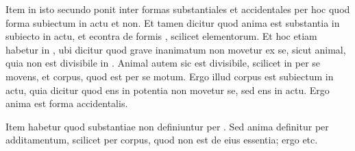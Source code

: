 \documentclass[b5paper,12pt]{book}
\begin{document}
\beginnumbering
{}

\pstart
   Item  in isto secundo ponit 
    inter formas substantiales et accidentales per hoc quod
   forma  subiectum in actu et
    non. Et tamen dicitur  quod anima est substantia in subiecto in
   actu, et econtra de formis , scilicet elementorum. Et hoc
   etiam habetur in ,
   ubi dicitur quod grave inanimatum non movetur ex se, sicut animal, quia non est divisibile in
   . Animal
   autem sic est divisibile, scilicet in 
    per se movens, et
   corpus, quod est per se motum. Ergo illud corpus est subiectum in actu, quia
   dicitur  quod ens in potentia non movetur  se, sed ens in actu. Ergo anima est forma accidentalis.
\pend

\pstart  
   Item   habetur quod substantiae non definiuntur per
   . Sed anima definitur per additamentum, scilicet per
   corpus, quod non est de eius essentia; ergo etc.
\pend

\endnumbering
\end{document}
